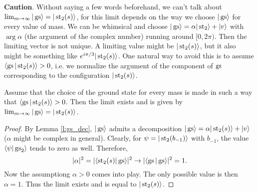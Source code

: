 \noindent \textbf{Caution}. Without saying a few words beforehand, we can't talk about $\lim_{m\rightarrow \infty} |\operatorname{gs}\rangle = |\operatorname{st}_2(s)\rangle$, for this limit depends on the way we choose $|\operatorname{gs}\rangle$ for every value of mass. We can be whimsical and choose $|\operatorname{gs} \rangle = \alpha |\operatorname{st}_2\rangle + |v\rangle$ with $\arg \alpha$ (the argument of the complex number) running around $[0,2\pi)$. Then the limiting vector is not unique. A limiting value might be $|\operatorname{st}_2(s)\rangle$, but it also might be something like $e^{i\pi/3} |\operatorname{st}_2(s)\rangle$. One natural way to avoid this is to assume $\langle \operatorname{gs} | \operatorname{st}_2(s) \rangle > 0$, i.e. we normalize the argument of the component of $\operatorname{gs}$ corresponding to the configuration $|\operatorname{st}_2(s)\rangle$.


\begin{proposition}
Assume that the choice of the ground state for every mass is made in such a way that $\langle \operatorname{gs}|\operatorname{st}_2(s)\rangle > 0$. Then
the limit exists and is given by $\lim_{m\rightarrow \infty} |\operatorname{gs}\rangle = |\operatorname{st}_2(s)\rangle$.
\end{proposition}
\begin{proof}
By Lemma \ref{l:gs_dec}, $|\operatorname{gs}\rangle$ admits a decomposition $|\operatorname{gs}\rangle = \alpha|\operatorname{st}_2(s)\rangle + |v\rangle$ ($\alpha$ might be complex in general). Clearly, for $\psi = |\operatorname{st}_2(b_{-1})\rangle$ with $b_{-1}$, the value $\langle \psi | \operatorname{gs}_2\rangle$ tends to zero as well. Therefore,
\[
|\alpha|^2 = |\langle \operatorname{st}_2(s) | \operatorname{gs} \rangle|^2 \rightarrow |\langle \operatorname{gs} | \operatorname{gs} \rangle|^2 =1.
\]
Now the assumptiong $\alpha > 0$ comes into play. The only possible value is then $\alpha = 1$. Thus the limit exists and is equal to $|\operatorname{st}_2(s)\rangle$.
\end{proof}
